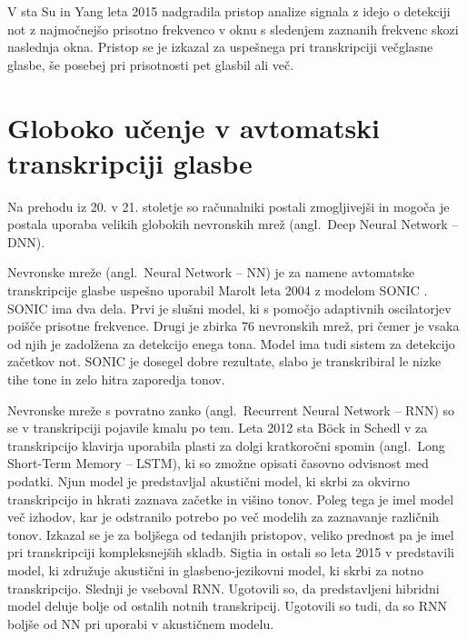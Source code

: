 \documentclass[a4paper, 12pt, openright]{book}
\newcommand{\en}{angl.}
\begin{document}
V \cite{su2015spectral} sta Su in Yang leta 2015 nadgradila pristop analize signala z idejo o detekciji not z najmočnejšo prisotno frekvenco v oknu s sledenjem zaznanih frekvenc skozi naslednja okna.
Pristop se je izkazal za uspešnega pri transkripciji večglasne glasbe, še posebej pri prisotnosti pet glasbil ali več.

\section{Globoko učenje v avtomatski transkripciji glasbe}

Na prehodu iz 20. v 21. stoletje so računalniki postali zmogljivejši in mogoča je postala uporaba velikih globokih nevronskih mrež (\en\ Deep Neural Network -- DNN).

Nevronske mreže (\en\ Neural Network -- NN) je za namene avtomatske transkripcije glasbe uspešno uporabil Marolt leta 2004 z modelom SONIC \cite{marolt2004sonic}.
SONIC ima dva dela.
Prvi je slušni model, ki s pomočjo adaptivnih oscilatorjev poišče prisotne frekvence.
Drugi je zbirka 76 nevronskih mrež, pri čemer je vsaka od njih je zadolžena za detekcijo enega tona.
Model ima tudi sistem za detekcijo začetkov not.
SONIC je dosegel dobre rezultate, slabo je transkribiral le nizke tihe tone in zelo hitra zaporedja tonov.

Nevronske mreže s povratno zanko (\en\ Recurrent Neural Network -- RNN) so se v transkripciji pojavile kmalu po tem.
Leta 2012 sta Böck in Schedl v \cite{bock2012rnn} za transkripcijo klavirja uporabila plasti za dolgi kratkoročni spomin (\en\ Long Short-Term Memory -- LSTM), ki so zmožne opisati časovno odvisnost med podatki.
Njun model je predstavljal akustični model, ki skrbi za okvirno transkripcijo in hkrati zaznava začetke in višino tonov.
Poleg tega je imel model več izhodov, kar je odstranilo potrebo po več modelih za zaznavanje različnih tonov.
Izkazal se je za boljšega od tedanjih pristopov, veliko prednost pa je imel pri transkripciji kompleksnejših skladb.
Sigtia in ostali so leta 2015 v \cite{sigtia2015hybrid} predstavili model, ki združuje akustični in glasbeno-jezikovni model, ki skrbi za notno transkripcijo.
Slednji je vseboval RNN.
Ugotovili so, da predstavljeni hibridni model deluje bolje od ostalih notnih transkripcij.
Ugotovili so tudi, da so RNN boljše od NN pri uporabi v akustičnem modelu.
\end{document}
